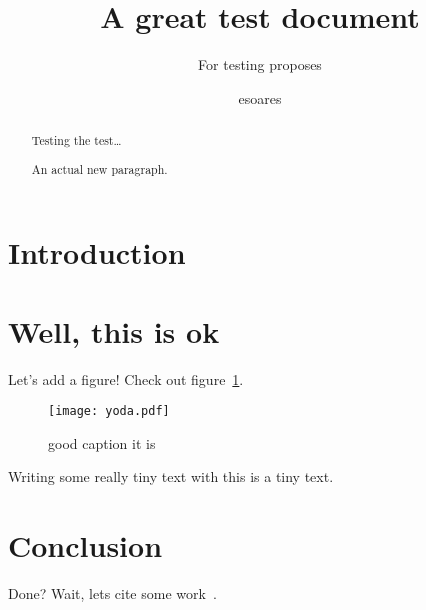 \documentclass[a4paper]{scrartcl}
\title{A great test document}
\subtitle{For testing proposes}
\author{esoares}
\begin{document}
\maketitle

\begin{abstract}
Testing the
test\ldots

An actual new paragraph.
\end{abstract}

\section{Introduction}

\section{Well, this is \ac{ok}}

Let's add a figure! Check out figure~\ref{fig:figure1}.

\begin{figure}
	\texttt{[image: yoda.pdf]}
	\caption{good caption it is}
	\label{fig:figure1}
\end{figure}

Writing some really tiny text with {\tiny this is a tiny text}.

\section{Conclusion}

Done?
Wait, lets cite some work~\cite{bibliography-mark}.

\end{document}
